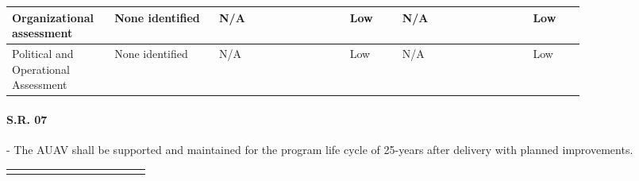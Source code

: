 \begin{fullwidth}
\begin{landscape}
{\begin{longtable}{| L{0.12\linewidth} | L{0.16\linewidth} |  L{0.20\linewidth} | L{0.08\linewidth} | L{0.20\linewidth} | L{0.08\linewidth} |}
        \hline
        Organizational assessment & None identified & N/A &  Low & N/A &  Low \\
        \hline
        Political and Operational Assessment & None identified & N/A &  Low & N/A &  Low
        \label{tab:sr06_feasibility}
    \end{longtable}
    }
    
    \newpage
    
    
    \paragraph{S.R. 07} - The AUAV shall be supported and maintained for the program life cycle of 25-years after delivery with planned improvements.
    
    {\fontsize{10pt}{11pt}\selectfont
    \begin{longtable}{| L{0.12\linewidth} | L{0.16\linewidth} |  L{0.20\linewidth} | L{0.08\linewidth} | L{0.20\linewidth} | L{0.08\linewidth} |}
        \hline \endlastfoot
        

\end{longtable}}
\end{landscape}
\end{fullwidth}
